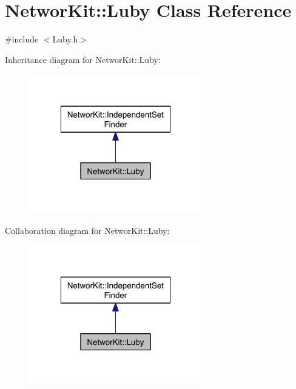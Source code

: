 \hypertarget{class_networ_kit_1_1_luby}{\section{Networ\-Kit\-:\-:Luby Class Reference}
\label{class_networ_kit_1_1_luby}
}


{\ttfamily \#include $<$Luby.\-h$>$}



Inheritance diagram for Networ\-Kit\-:\-:Luby\-:\nopagebreak
\begin{figure}[H]
\begin{center}
\leavevmode
\includegraphics[width=214pt]{class_networ_kit_1_1_luby__inherit__graph}
\end{center}
\end{figure}


Collaboration diagram for Networ\-Kit\-:\-:Luby\-:\nopagebreak
\begin{figure}[H]
\begin{center}
\leavevmode
\includegraphics[width=214pt]{class_networ_kit_1_1_luby__coll__graph}
\end{center}
\end{figure}
